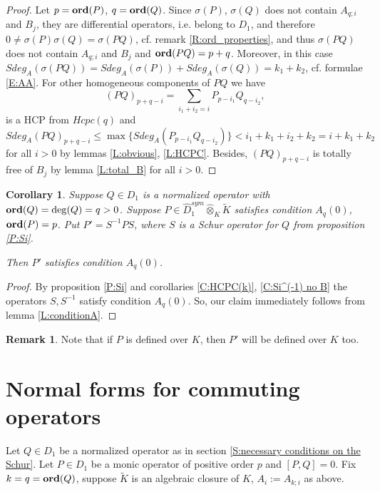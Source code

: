 \documentclass[11pt]{article}
\theoremstyle{definition}
\newcommand{\Ord}{\mathop {\rm \bf ord}}
\newtheorem{rem}{Remark}[section]
\theoremstyle{plain}
\newtheorem{cor}{Corollary}[section]
\numberwithin{equation}{section}
\begin{document}
\begin{proof}
Let $p=\Ord (P)$, $q=\Ord (Q)$. Since $\sigma (P)$, $\sigma (Q)$ does not contain $A_{q;i}$ and $B_j$, they are differential operators, i.e. belong to $D_1$, and therefore $0\neq \sigma (P)\sigma (Q)=\sigma (PQ)$, cf. remark \ref{R:ord_properties}, and thus $\sigma (PQ)$ does not contain $A_{q;i}$ and $B_j$ and $\Ord (PQ)=p+q$. Moreover, in this case $Sdeg_A(\sigma (PQ))= Sdeg_A(\sigma (P))+Sdeg_A(\sigma (Q))=k_1+k_2$, cf. formulae \eqref{E:AA}. For other homogeneous components of $PQ$ we have
$$
(PQ)_{p+q-i}=\sum_{i_1+i_2=i}P_{p-i_1}Q_{q-i_2},
$$
is a HCP from $Hcpc(q)$ and  
$$
Sdeg_A(PQ)_{p+q-i}\le \max\{Sdeg_A(P_{p-i_1}Q_{q-i_2})\}< i_1+k_1+i_2+k_2=i+k_1+k_2
$$
for all $i>0$ by lemmas \ref{L:obvious}, \ref{L:HCPC}. Besides, $(PQ)_{p+q-i}$ is totally free of $B_j$ by lemma \ref{L:total_B} for all $i>0$. 
\end{proof}

\begin{cor}
	\label{C:P'}
	Suppose $Q\in D_1$ is a normalized operator with  $\Ord (Q)=\deg (Q)=q> 0$. 
	Suppose $P\in \hat{D}_1^{sym}\hat{\otimes}_K\tilde{K}$  satisfies condition $A_q(0)$, $\Ord (P)=p$. 
	 Put $P'=S^{-1}PS$, where $S$ is a Schur operator for $Q$ from proposition \ref{P:Si}. 
	 
	 Then $P'$ satisfies condition $A_q(0)$.
\end{cor}

\begin{proof}
By proposition \ref{P:Si} and corollaries \ref{C:HCPC(k)}, \ref{C:Si^(-1) no B} the operators $S, S^{-1}$ satisfy condition $A_q(0)$. So, our claim immediately follows from lemma \ref{L:conditionA}. 

\end{proof}

\begin{rem}
Note that if $P$ is defined over $K$, then $P'$ will be defined over $K$ too. 
\end{rem}


\section{Normal forms for commuting operators}
\label{S:normal_forms_for_commuting}


Let $Q\in D_1$ be a normalized operator as in section \ref{S:necessary conditions on the Schur}. Let $P\in D_1$ be a monic operator of positive order $p$ and $[P,Q]=0$. Fix $k=q=\Ord(Q)$, suppose $\tilde{K}$ is an algebraic closure of $K$, $A_i:=A_{k;i}$ as above. 
\end{document}
